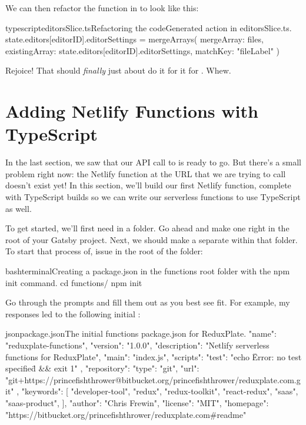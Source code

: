 \documentclass[a4paper,headinclude=on,footinclude=on,12pt,oneside]{scrbook}
\begin{document}
We can then refactor the  function in  to look like this:

\begin{codeInput}{typescript}{editorsSlice.ts}{Refactoring the codeGenerated action in editorsSlice.ts.}
state.editors[editorID].editorSettings = mergeArrays({
  mergeArray: files,
  existingArray: state.editors[editorID].editorSettings,
  matchKey: "fileLabel"
})
\end{codeInput}

Rejoice! That should \textit{finally} just about do it for it for . Whew. 

\section{Adding Netlify Functions with TypeScript}

In the last section, we saw that our API call to  is ready to go. But there's a small problem right now: the Netlify function at the URL  that we are trying to call doesn't exist yet! In this section, we'll build our first Netlify function, complete with TypeScript builds so we can write our serverless functions to use TypeScript as well.


To get started, we'll first need in a  folder. Go ahead and make one right in the root of your Gatsby project. Next, we should make a separate  within that folder. To start that process of, issue  in the root of the  folder:

\begin{codeInput}{bash}{terminal}{Creating a package.json in the functions root folder with the npm init command.}
cd functions/
npm init
\end{codeInput}

Go through the prompts and fill them out as you best see fit. For example, my responses led to the following initial :

\begin{codeInput}{json}{package.json}{The initial functions package.json for ReduxPlate.}
{
  "name": "reduxplate-functions",
  "version": "1.0.0",
  "description": "Netlify serverless functions for ReduxPlate",
  "main": "index.js",
  "scripts": {
    "test": "echo \"Error: no test specified\" && exit 1"
  },
  "repository": {
    "type": "git",
    "url": "git+https://princefishthrower@bitbucket.org/princefishthrower/reduxplate.com.git"
  },
  "keywords": [
    "developer-tool",
    "redux",
    "redux-toolkit",
    "react-redux",
    "saas",
    "saas-product",
  ],
  "author": "Chris Frewin",
  "license": "MIT",
  "homepage": "https://bitbucket.org/princefishthrower/reduxplate.com#readme"
}
\end{codeInput}
\end{document}
